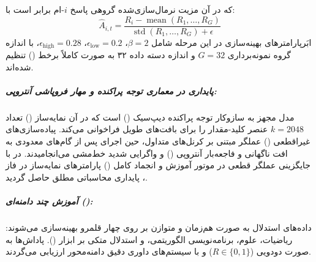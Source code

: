 که در آن مزیت نرمال‌سازی‌شده گروهی پاسخ $i$-ام برابر است با:
\begin{equation}
    \hat{A}_{i,t} = \frac{R_i - \operatorname{mean}(R_1, \dots, R_G)}{\operatorname{std}(R_1, \dots, R_G) + \epsilon}
\end{equation}
ابَرپارامترهای بهینه‌سازی در این مرحله شامل $\beta = 2$، $\epsilon_{\text{low}} = 0.2$، $\epsilon_{\text{high}} = 0.28$، با اندازه گروه نمونه‌برداری $G = 32$ و اندازه دسته داده ۳۲ به صورت کاملاً برخط () تنظیم شده‌اند.

\subparagraph*{پایداری در معماری توجه پراکنده  و مهار فروپاشی آنتروپی:}
مدل  مجهز به سازوکار توجه پراکنده دیپ‌سیک () \cite{deepseek2025v32} است که در آن نمایه‌ساز () تعداد $k=2048$ عنصر کلید-مقدار را برای بافت‌های طویل فراخوانی می‌کند. پیاده‌سازی‌های غیراقطعی () عملگر  مبتنی بر کرنل‌های متداول، حین اجرای  پس از گام‌های معدودی به افت ناگهانی و فاجعه‌بار آنتروپی () و واگرایی شدید خط‌مشی می‌انجامیدند. در  با جایگزینی عملگر قطعی  در موتور آموزش و انجماد کامل () پارامترهای نمایه‌ساز در فاز ، پایداری محاسباتی مطلق حاصل گردید.

\subparagraph*{آموزش چند دامنه‌ای ():}
داده‌های استدلال به صورت هم‌زمان و متوازن بر روی چهار قلمرو بهینه‌سازی می‌شوند: ریاضیات، علوم، برنامه‌نویسی الگوریتمی، و استدلال متکی بر ابزار (). پاداش‌ها به صورت دودویی ($R \in \{0, 1\}$) و با سیستم‌های داوری دقیق دامنه‌محور ارزیابی می‌گردند.

